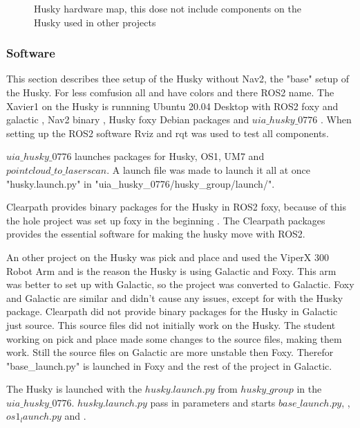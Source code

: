 \begin{figure}[H]
\begin{minipage}[b]{0.59\textwidth}
    \caption{Husky hardware map, this dose not include components on the Husky used in other projects}
    \label{fig:Husky_HW}
  \end{minipage}
\end{figure}
\subsubsection{Software}
This section describes thee setup of the Husky without Nav2, the "base" setup of the Husky. For less comfusion all  and  have colors and there ROS2 name. 
The Xavier1 on the Husky is runnning Ubuntu 20.04 Desktop \cite{ubuntu20_04} with ROS2 foxy \cite{rosfoxyinstall} and galactic \cite{rosgalacticinstall}, Nav2 binary \cite{rosnavinstall}, Husky foxy Debian packages \cite{huskyinstall} and $uia\_husky\_0776$ \cite{uiahusky}. When setting up the ROS2 software Rviz and rqt was used to test all components. \newline
    
$uia\_husky\_0776$ launches packages for Husky, OS1, UM7 and $pointcloud\_to\_laserscan$. A launch file was made to launch it all at once "husky.launch.py" in "uia\_husky\_0776/husky\_group/launch/".


Clearpath provides binary packages for the Husky in ROS2 foxy, because of this the hole project was set up foxy in the beginning . The Clearpath packages provides the essential software for making the husky move with ROS2.

An other project on the Husky was pick and place and used the ViperX 300 Robot Arm and is the reason the Husky is using Galactic and Foxy. This arm was better to set up with Galactic, so the project was converted to Galactic. Foxy and Galactic are similar and didn't cause any issues, except for with the Husky package. Clearpath did not provide binary packages for the Husky in Galactic just source. This source files did not initially work on the Husky. The student working on pick and place made some changes to the source files, making them work. Still the source files on Galactic are more unstable then Foxy. Therefor "base\_launch.py" is launched in Foxy and the rest of the project in Galactic. 

The Husky is launched with the $husky.launch.py$ from $husky\_group$ in the $uia\_husky\_0776$. $husky.launch.py$ pass in parameters and starts $base\_launch.py$, , $os1_launch.py$ and . 

